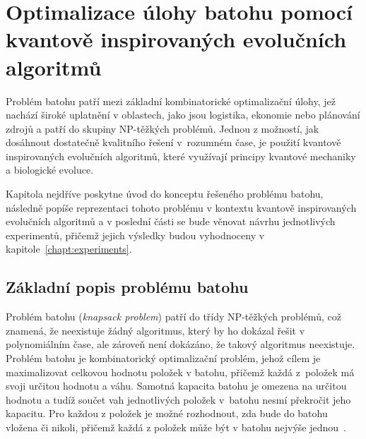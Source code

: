 \chapter{Optimalizace úlohy batohu pomocí kvantově inspirovaných evolučních algoritmů}

Problém batohu patří mezi základní kombinatorické optimalizační úlohy, jež nachází široké uplatnění v oblastech, jako jsou logistika, ekonomie nebo plánování zdrojů a patří do skupiny NP-těžkých problémů. 
Jednou z možností, jak dosáhnout dostatečně kvalitního řešení v~rozumném čase, je použití kvantově inspirovaných evolučních algoritmů, které využívají principy kvantové mechaniky a biologické evoluce. 

Kapitola nejdříve poskytne úvod do konceptu řešeného problému batohu, následně popíše reprezentaci tohoto problému v kontextu kvantově inspirovaných evolučních algoritmů a v poslední části se bude věnovat návrhu jednotlivých experimentů, přičemž jejich výsledky budou vyhodnoceny v kapitole~\ref{chapt:experiments}.

\section{Základní popis problému batohu}
Problém batohu (\emph{knapsack problem}) patří do třídy NP-těžkých problémů, což znamená, že neexistuje žádný algoritmus, který by ho dokázal řešit v polynomiálním čase, ale zároveň není dokázáno, že takový algoritmus neexistuje.
Problém batohu je kombinatorický optimalizační problém, jehož cílem je maximalizovat celkovou hodnotu položek v batohu, přičemž každá z~položek má svoji určitou hodnotu a váhu. 
Samotná kapacita batohu je omezena na určitou hodnotu a tudíž součet vah jednotlivých položek v~batohu nesmí překročit jeho kapacitu. 
Pro každou z položek je možné rozhodnout, zda bude do batohu vložena či nikoli, přičemž každá z položek může být v batohu nejvýše jednou~\cite{ApproximationAlgorithms,IntroductionToAlgorithms}. 

